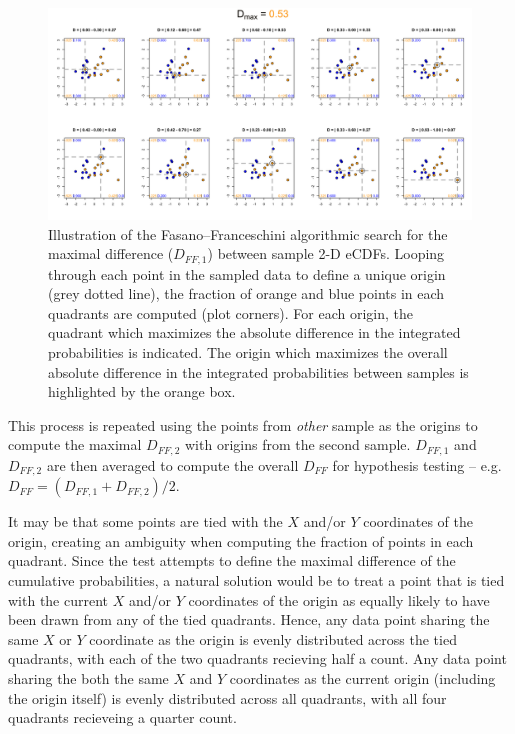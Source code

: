 \documentclass[codesnippet]{jss}
\newcommand{\RBnote}[1]{\textcolor{red}{#1}}
\begin{document}
\begin{figure}[t!]
\centering
\includegraphics{fftestOutput}
\caption{\label{fig:kstest2D} Illustration of the Fasano--Franceschini algorithmic search for the maximal difference ($D_{FF,1}$) between sample 2-D eCDFs. Looping through each point in the sampled data to define a unique origin (grey dotted line), the fraction of orange and blue points in each quadrants are computed (plot corners). For each origin, the quadrant which maximizes the absolute difference in the integrated probabilities is indicated. The origin which maximizes the overall absolute difference in the integrated probabilities between samples is highlighted by the orange box.
}
\end{figure}

This process is repeated using the points from \textit{other} sample
as the origins to compute the maximal $D_{FF,2}$ with origins from the
second sample. $D_{FF,1}$ and $D_{FF,2}$  are then averaged to compute
the overall $D_{FF}$ for hypothesis testing -- e.g.
$D_{FF}=(D_{FF,1}+D_{FF,2})/2$.

It may be that some points are tied with the $X$ and/or $Y$
coordinates of the origin, creating an ambiguity when computing the
fraction of points in each quadrant. Since the
test attempts to define the maximal difference of the cumulative
probabilities, a natural solution would be to treat a point that is
tied with the current $X$ and/or $Y$ coordinates of the origin as equally
likely to have been drawn from any of the tied quadrants.
Hence, any data point
sharing the same $X$ or $Y$ coordinate as the origin is evenly
distributed across the tied quadrants, with each of the two quadrants
recieving half a count. Any data point sharing the both the same $X$ and $Y$
coordinates as the current origin (including the origin itself) is evenly
distributed across all quadrants, with all four quadrants recieveing a
quarter count.
\end{document}
